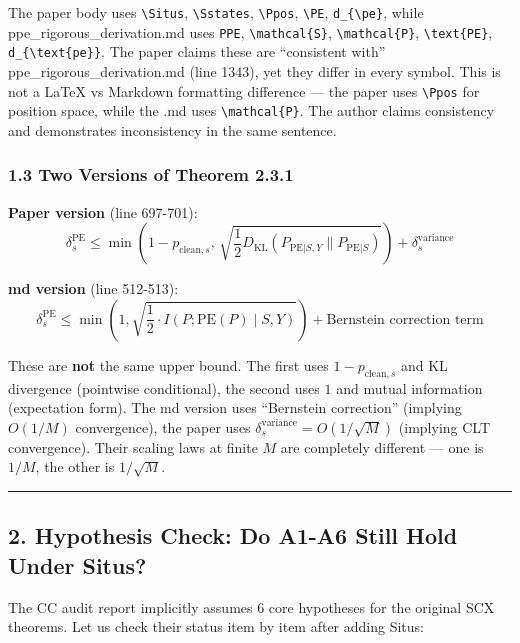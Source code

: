\documentclass[
  12pt,
]{article}
\begin{document}
The paper body uses \texttt{{\textbackslash}Situs}, \texttt{{\textbackslash}Sstates}, \texttt{{\textbackslash}Ppos}, \texttt{{\textbackslash}PE}, \texttt{d\_\{{\textbackslash}pe\}}, while ppe\_rigorous\_derivation.md uses \texttt{PPE}, \texttt{{\textbackslash}mathcal\{S\}}, \texttt{{\textbackslash}mathcal\{P\}}, \texttt{{\textbackslash}text\{PE\}}, \texttt{d\_\{{\textbackslash}text\{pe\}\}}. The paper claims these are ``consistent with'' ppe\_rigorous\_derivation.md (line 1343), yet they differ in every symbol. This is not a LaTeX vs Markdown formatting difference --- the paper uses \texttt{{\textbackslash}Ppos} for position space, while the .md uses \texttt{{\textbackslash}mathcal\{P\}}. The author claims consistency and demonstrates inconsistency in the same sentence.

\subsubsection{1.3 Two Versions of Theorem 2.3.1}\label{two-versions-thm-2.3.1}

\textbf{Paper version} (line 697-701):
\[\delta_s^{\text{PE}} \leq \min\!\left(1 - p_{\text{clean}, s},\, \sqrt{\frac{1}{2} D_{\text{KL}}(P_{\text{PE}|S,Y} \| P_{\text{PE}|S})}\right) + \delta_s^{\text{variance}}\]

\textbf{md version} (line 512-513):
\[\delta_s^{\text{PE}} \leq \min\left(1, \sqrt{\frac{1}{2} \cdot I(P; \text{PE}(P) \mid S, Y)}\right) + \text{Bernstein correction term}\]

These are \textbf{not} the same upper bound. The first uses $1-p_{\text{clean},s}$ and KL divergence (pointwise conditional), the second uses $1$ and mutual information (expectation form). The md version uses ``Bernstein correction'' (implying $O(1/M)$ convergence), the paper uses $\delta_s^{\text{variance}} = O(1/\sqrt{M})$ (implying CLT convergence). Their scaling laws at finite $M$ are completely different --- one is $1/M$, the other is $1/\sqrt{M}$.

\begin{center}\rule{0.5\linewidth}{0.5pt}\end{center}

\subsection{2. Hypothesis Check: Do A1-A6 Still Hold Under Situs?}\label{hypothesis-check-a1-a6-situs}

The CC audit report implicitly assumes 6 core hypotheses for the original SCX theorems. Let us check their status item by item after adding Situs:
\end{document}

